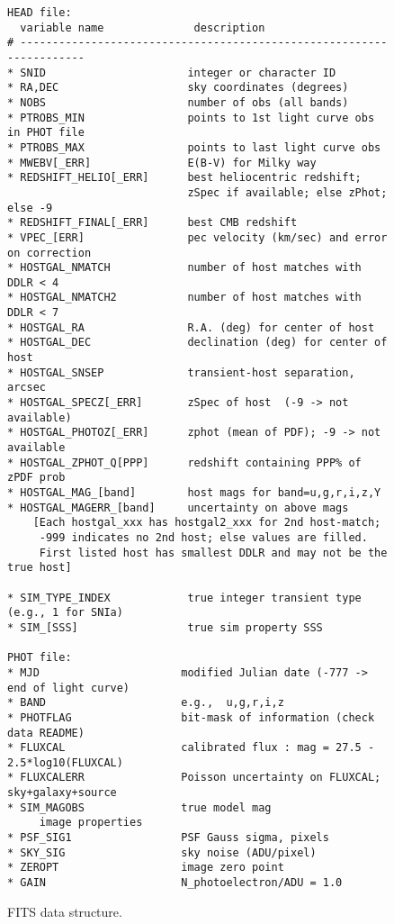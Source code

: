 \documentclass[12pt]{article}
\begin{document}
{\begin{figure} [ht] 
\begin{center}
\begin{Verbatim}[frame=single]
HEAD file:   
  variable name              description
# ---------------------------------------------------------------------
* SNID                      integer or character ID
* RA,DEC                    sky coordinates (degrees)
* NOBS                      number of obs (all bands)
* PTROBS_MIN                points to 1st light curve obs in PHOT file
* PTROBS_MAX                points to last light curve obs
* MWEBV[_ERR]               E(B-V) for Milky way
* REDSHIFT_HELIO[_ERR]      best heliocentric redshift;
                            zSpec if available; else zPhot; else -9
* REDSHIFT_FINAL[_ERR]      best CMB redshift
* VPEC_[ERR]                pec velocity (km/sec) and error on correction
* HOSTGAL_NMATCH            number of host matches with DDLR < 4
* HOSTGAL_NMATCH2           number of host matches with DDLR < 7
* HOSTGAL_RA                R.A. (deg) for center of host
* HOSTGAL_DEC               declination (deg) for center of host
* HOSTGAL_SNSEP             transient-host separation, arcsec
* HOSTGAL_SPECZ[_ERR]       zSpec of host  (-9 -> not available)
* HOSTGAL_PHOTOZ[_ERR]      zphot (mean of PDF); -9 -> not available
* HOSTGAL_ZPHOT_Q[PPP]      redshift containing PPP% of zPDF prob
* HOSTGAL_MAG_[band]        host mags for band=u,g,r,i,z,Y
* HOSTGAL_MAGERR_[band]     uncertainty on above mags
    [Each hostgal_xxx has hostgal2_xxx for 2nd host-match;
     -999 indicates no 2nd host; else values are filled.
     First listed host has smallest DDLR and may not be the true host]
    
* SIM_TYPE_INDEX            true integer transient type (e.g., 1 for SNIa)
* SIM_[SSS]                 true sim property SSS

PHOT file:
* MJD                      modified Julian date (-777 -> end of light curve)
* BAND                     e.g.,  u,g,r,i,z
* PHOTFLAG                 bit-mask of information (check data README)
* FLUXCAL                  calibrated flux : mag = 27.5 - 2.5*log10(FLUXCAL)
* FLUXCALERR               Poisson uncertainty on FLUXCAL; sky+galaxy+source
* SIM_MAGOBS               true model mag
     image properties
* PSF_SIG1                 PSF Gauss sigma, pixels
* SKY_SIG                  sky noise (ADU/pixel)
* ZEROPT                   image zero point
* GAIN                     N_photoelectron/ADU = 1.0
\end{Verbatim}
\end{center}
\caption{
  FITS data structure.
 }
\label{fig:data_format}
\end{figure}


}
\end{document}
